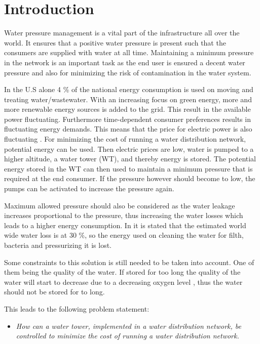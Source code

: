 \chapter{Introduction}

Water pressure management is a vital part of the infrastructure all over the world. It ensures that a positive water pressure is present such that the consumers are supplied with water at all time. Maintaining a minimum pressure in the network is an important task as the end user is ensured a decent water pressure and also for minimizing the risk of contamination in the water system\cite{national2005public}.

In the U.S alone 4 \% of the national energy consumption is used on moving and treating water/wastewater\cite{appelbaum2002water}. With an increasing focus on green energy, more and more renewable energy sources is added to the grid. This result in the available power fluctuating. Furthermore time-dependent consumer
preferences results in fluctuating energy demands. This means that the price for electric power is also fluctuating \cite{fluctuating_price}. For minimizing the cost of running a water distribution network, potential energy can be used. Then electric prices are low, water is pumped to a higher altitude, a water tower (WT), and thereby energy is stored. The potential energy stored in the WT can then used to maintain a minimum pressure that is required at the end consumer. If the pressure however should become to low, the pumps can be activated to increase the pressure again. 

Maximum allowed pressure should also be considered as the water leakage increases proportional to the pressure\cite{feldman2009aspects}, thus increasing the water losses which leads to a higher energy consumption. In \cite{feldman2009aspects} it is stated that the estimated world wide water loss is at 30 \%, so the energy used on cleaning the water for filth, bacteria and pressurizing it is lost. 

Some constraints to this solution is still needed to be taken into account. One of them being the quality of the water. If stored for too long the quality of the water will start to decrease due to a decreasing oxygen level \cite{Lenntech,DO}, thus the water should not be stored for to long. 


%

This leads to the following problem statement:
\begin{itemize}
\item \textit{How can a water tower, implemented in a water distribution network, be controlled to minimize the cost of running a water distribution network.}
\end{itemize} 

